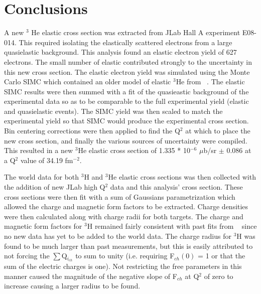 \chapter{Conclusions} %
\label{ch:conclusions} %

A new $^3$ He elastic cross section was extracted from JLab Hall A experiment E08-014. This required isolating the elastically scattered electrons from a large quasielastic background. This analysis found an elastic electron yield of 627 electrons. The small number of elastic contributed strongly to the uncertainty in this new cross section. The elastic electron yield was simulated using the Monte Carlo SIMC which contained an older model of elastic $^3$He from ~\cite{Article:Amroun}. The elastic SIMC results were then summed with a fit of the quasieastic background of the experimental data so as to be comparable to the full experimental yield (elastic and quasielastic events). The SIMC yield was then scaled to match the experimental yield so that SIMC would produce the experimental cross section. Bin centering corrections were then applied to find the Q$^2$ at which to place the new cross section, and finally the various sources of uncertainty were compiled. This resulted in a new $^3$He elastic cross section of 1.335 * 10$^{-6}$ $\mu$b/sr $\pm$ 0.086 at a Q$^2$ value of 34.19 fm$^{-2}$. 

The world data for both $^3$H and $^3$He elastic cross sections was then collected with the addition of new JLab high Q$^2$ data and this analysis' cross section. These cross sections were then fit with a sum of Gaussians parametrization which allowed the charge and magnetic form factors to be extracted. Charge densities were then calculated along with charge radii for both targets. The charge and magnetic form factors for $^3$H remained fairly consistent with past fits from ~\cite{Article:Amroun} since no new data has yet to be added to the world data. The charge radius for $^3$H was found to be much larger than past measurements, but this is easily attributed to not forcing the $\sum$Q$_{i_{ch}}$ to sum to unity (i.e. requiring F$_{ch}(0)$ = 1 or that the sum of the electric charges is one). Not restricting the free parameters in this manner caused the magnitude of the negative slope of F$_{ch}$ at Q$^2$ of zero to increase causing a larger radius to be found.


